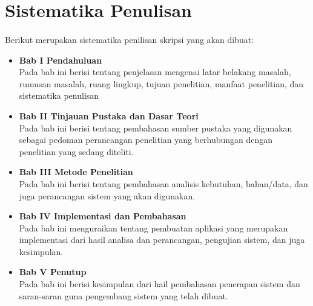 \documentclass[./bab_1.tex]{subfiles}
\begin{document}
\section{Sistematika Penulisan}
\paragraph*{}Berikut merupakan sistematika penilisan skripsi
yang akan dibuat:

\begin{itemize}
  \item\textbf{Bab I Pendahuluan}\\
  Pada bab ini berisi tentang penjelasan
  mengenai latar belakang masalah, rumusan masalah, ruang
  lingkup, tujuan penelitian, manfaat penelitian, dan
  sistematika penulisan

  \item\textbf{Bab II Tinjauan Pustaka dan Dasar Teori}\\
  Pada bab ini berisi tentang pembahasan sumber pustaka yang
  digunakan sebagai pedoman perancangan penelitian yang
  berhubungan dengan penelitian yang sedang diteliti.

  \item\textbf{Bab III Metode Penelitian}\\
  Pada bab ini berisi tentang pembahasan analisis kebutuhan,
  bahan/data, dan juga perancangan sistem yang akan
  digunakan.

  \item\textbf{Bab IV Implementasi dan Pembahasan}\\
  Pada bab ini menguraikan tentang pembuatan aplikasi yang
  merupakan implementasi dari hasil analisa dan perancangan,
  pengujian sistem, dan juga kesimpulan.

  \item\textbf{Bab V Penutup}\\
  Pada bab ini berisi kesimpulan dari hail pembahasan
  penerapan sistem dan saran-saran guna pengembang sistem
  yang telah dibuat.
\end{itemize}
\end{document}
